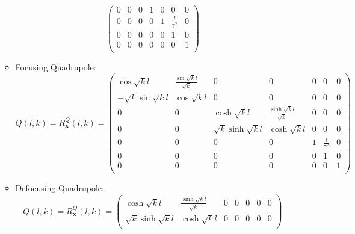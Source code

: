 \begin{itemize}
\begin{itemize}
\begin{equation*}
\begin{pmatrix}
                                             0 & 0 & 0 & 1 & 0 & 0 & 0 \\ %
                                             0 & 0 & 0 & 0 & 1 & \frac{l}{\gamma^2} & 0 \\ %
                                             0 & 0 & 0 & 0 & 0 & 1 & 0 \\ %
                                             0 & 0 & 0 & 0 & 0 & 0 & 1 \\
                                         \end{pmatrix}
            \end{equation*}
        \item Focusing Quadrupole:
            \begin{equation*}
                Q(l,k) = R_{\bm{x}}^Q (l,k) = \begin{pmatrix}
                                                  \cos{\sqrt{k} l} & \frac{\sin{\sqrt{k} l}}{\sqrt{k}} & 0 & 0 & 0 & 0 & 0 \\ %
                                                  -\sqrt{k}\sin{\sqrt{k} l} & \cos{\sqrt{k} l} & 0 & 0 & 0 & 0 & 0 \\ %
                                                  0 & 0 & \cosh{\sqrt{k} l} & \frac{\sinh{\sqrt{k} l}}{\sqrt{k}} & 0 & 0 & 0 \\ %
                                                  0 & 0 & \sqrt{k}\sinh{\sqrt{k} l} & \cosh{\sqrt{k} l} & 0 & 0 & 0 \\ %
                                                  0 & 0 & 0 & 0 & 1 & \frac{l}{\gamma^2} & 0 \\ %
                                                  0 & 0 & 0 & 0 & 0 & 1 & 0 \\ %
                                                  0 & 0 & 0 & 0 & 0 & 0 & 1 \\
                                              \end{pmatrix}
            \end{equation*}
        \item Defocusing Quadrupole:
            \begin{equation*}
                Q(l,k) = R_{\bm{x}}^Q (l,k) = \begin{pmatrix}
                                                  \cosh{\sqrt{k} l} & \frac{\sinh{\sqrt{k} l}}{\sqrt{k}} & 0 & 0 & 0 & 0 & 0 \\ %
                                                  \sqrt{k}\sinh{\sqrt{k} l} & \cosh{\sqrt{k} l} & 0 & 0 & 0 & 0 & 0 \\ %

\end{pmatrix}
\end{equation*}
\end{itemize}
\end{itemize}

